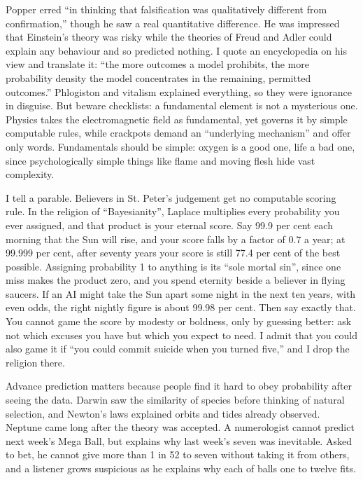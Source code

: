 Popper erred ``in thinking that falsification was qualitatively different from confirmation,'' though he saw a real quantitative difference. He was impressed that Einstein's theory was risky while the theories of Freud and Adler could explain any behaviour and so predicted nothing. I quote an encyclopedia on his view and translate it: ``the more outcomes a model prohibits, the more probability density the model concentrates in the remaining, permitted outcomes.''  Phlogiston and vitalism explained everything, so they were ignorance in disguise. But beware checklists: a fundamental element is not a mysterious one. Physics takes the electromagnetic field as fundamental, yet governs it by simple computable rules, while crackpots demand an ``underlying mechanism'' and offer only words. Fundamentals should be simple: oxygen is a good one, life a bad one, since psychologically simple things like flame and moving flesh hide vast complexity.

I tell a parable. Believers in St. Peter's judgement get no computable scoring rule. In the religion of ``Bayesianity'', Laplace multiplies every probability you ever assigned, and that product is your eternal score. Say 99.9 per cent each morning that the Sun will rise, and your score falls by a factor of 0.7 a year; at 99.999 per cent, after seventy years your score is still 77.4 per cent of the best possible. Assigning probability 1 to anything is its ``sole mortal sin'', since one miss makes the product zero, and you spend eternity beside a believer in flying saucers. If an AI might take the Sun apart some night in the next ten years, with even odds, the right nightly figure is about 99.98 per cent. Then say exactly that.  You cannot game the score by modesty or boldness, only by guessing better: ask not which excuses you have but which you expect to need. I admit that you could also game it if ``you could commit suicide when you turned five,'' and I drop the religion there.

Advance prediction matters because people find it hard to obey probability after seeing the data. Darwin saw the similarity of species before thinking of natural selection, and Newton's laws explained orbits and tides already observed. Neptune came long after the theory was accepted. A numerologist cannot predict next week's Mega Ball, but explains why last week's seven was inevitable. Asked to bet, he cannot give more than 1 in 52 to seven without taking it from others, and a listener grows suspicious as he explains why each of balls one to twelve fits.

